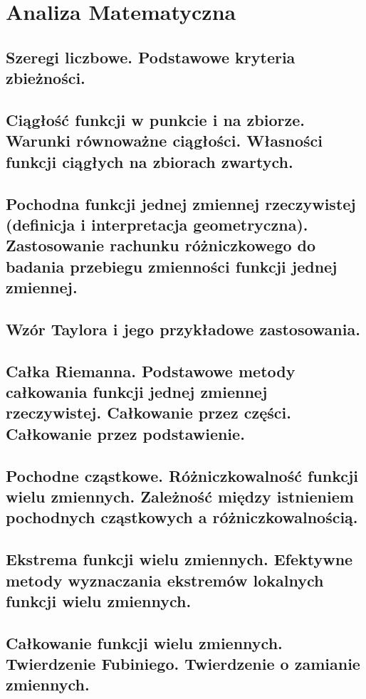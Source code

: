 \chapter{Analiza Matematyczna}

\section{Szeregi liczbowe. Podstawowe kryteria zbieżności.}

\section{Ciągłość funkcji w punkcie i na zbiorze. Warunki równoważne ciągłości. Własności funkcji ciągłych na zbiorach zwartych.}
\section{Pochodna funkcji jednej zmiennej rzeczywistej (definicja i interpretacja geometryczna). Zastosowanie rachunku różniczkowego do badania przebiegu zmienności funkcji jednej zmiennej.}
\section{Wzór Taylora i jego przykładowe zastosowania.}
\section{Całka Riemanna. Podstawowe metody całkowania funkcji jednej zmiennej rzeczywistej. Całkowanie przez części. Całkowanie przez podstawienie.}
\section{Pochodne cząstkowe. Różniczkowalność funkcji wielu zmiennych. Zależność między istnieniem pochodnych cząstkowych a różniczkowalnością.}
\section{Ekstrema funkcji wielu zmiennych. Efektywne metody wyznaczania ekstremów lokalnych funkcji wielu zmiennych.}
\section{Całkowanie funkcji wielu zmiennych. Twierdzenie Fubiniego. Twierdzenie o zamianie zmiennych.}